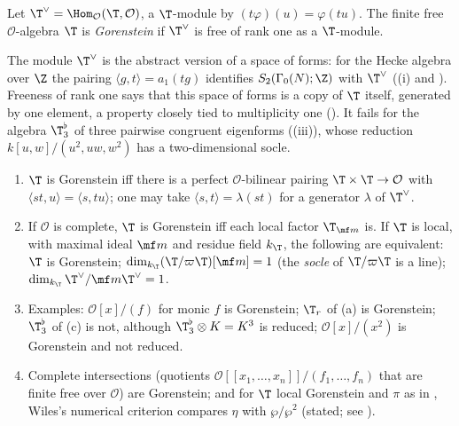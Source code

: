 \begin{definition}\label{def:modules:gorenstein}
Let $\T^\vee=\Hom_{\mathcal O}(\T,\mathcal O)$, a $\T$-module by $(t\varphi)(u)=\varphi(tu)$. The finite free $\mathcal O$-algebra $\T$ is \emph{Gorenstein} if $\T^\vee$ is free of rank one
as a $\T$-module.
\end{definition}

The module $\T^\vee$ is the abstract version of a space of forms: for the Hecke algebra over $\Z$ the pairing $\langle g,t\rangle=a_1(tg)$ identifies
$S_2(\Gamma_0(N);\Z)$ with $\T^\vee$ ((i) and ). Freeness of rank one says that
this space of forms is a copy of $\T$ itself, generated by one element, a property closely tied to multiplicity one
(). It fails for the algebra $\T^\flat_3$ of three pairwise congruent eigenforms ((iii)),
whose reduction $k[u,w]/(u^2,uw,w^2)$ has a two-dimensional socle.

\begin{proposition}\label{prop:modules:gorenstein}
\begin{enumerate}[label=(\roman*)]
\item $\T$ is Gorenstein iff there is a perfect $\mathcal O$-bilinear pairing $\T\times\T\to\mathcal O$ with $\langle st,u\rangle=\langle s,tu\rangle$; one may take $\langle s,t\rangle=\lambda(st)$ for a
generator $\lambda$ of $\T^\vee$.
\item If $\mathcal O$ is complete, $\T$ is Gorenstein iff each local factor $\T_{\mf m}$ is. If $\T$ is local, with maximal ideal $\mf m$ and residue field $k_\T$, the following
are equivalent: $\T$ is Gorenstein; $\dim_{k_\T}(\T/\varpi\T)[\mf m]=1$ (the \emph{socle} of $\T/\varpi\T$ is a line); $\dim_{k_\T}\T^\vee/\mf m\T^\vee=1$.
\item Examples: $\mathcal O[x]/(f)$ for monic $f$ is Gorenstein; $\T_r$ of (a) is Gorenstein; $\T^\flat_3$ of (c) is not, although
$\T^\flat_3\otimes K=K^3$ is reduced; $\mathcal O[x]/(x^2)$ is Gorenstein and not reduced.
\item Complete intersections (quotients $\mathcal O[[x_1,\dots,x_n]]/(f_1,\dots,f_n)$ that are finite free over $\mathcal O$) are Gorenstein; and for $\T$ local Gorenstein
and $\pi$ as in , Wiles's numerical criterion compares $\eta$ with $\wp/\wp^2$ (stated; see ).
\end{enumerate}
\end{proposition}

